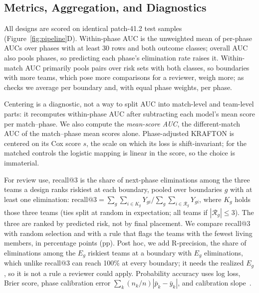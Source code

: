 \documentclass[sigconf,anonymous]{acmart}
\begin{document}
\subsection{Metrics, Aggregation, and Diagnostics}
\label{sec:method:units}
All designs are scored on identical patch-41.2 test samples (Figure~\ref{fig:pipeline}D). Within-phase AUC is the unweighted mean of per-phase AUCs over phases with at least 30 rows and both outcome classes; overall AUC also pools phases, so predicting each phase's elimination rate raises it. Within-match AUC primarily pools pairs over risk sets with both classes, so boundaries with more teams, which pose more comparisons for a reviewer, weigh more; as checks we average per boundary and, with equal phase weights, per phase.

Centering is a diagnostic, not a way to split AUC into match-level and team-level parts: it recomputes within-phase AUC after subtracting each model's mean score per match--phase. We also compute the \emph{mean-score AUC}, the different-match AUC of the match--phase mean scores alone. Phase-adjusted KRAFTON is centered on its Cox score $s$, the scale on which its loss is shift-invariant; for the matched controls the logistic mapping is linear in the score, so the choice is immaterial.

For review use, recall@3 is the share of next-phase eliminations among the three teams a design ranks riskiest at each boundary, pooled over boundaries $g$ with at least one elimination: $\mathrm{recall@3}=\sum_g\sum_{i\in K_g}Y_{gi}\big/\sum_g\sum_{i\in\mathcal{R}_g}Y_{gi}$, where $K_g$ holds those three teams (ties split at random in expectation; all teams if $|\mathcal{R}_g|\le3$). The three are ranked by predicted risk, not by final placement. We compare recall@3 with random selection and with a rule that flags the teams with the fewest living members, in percentage points (pp). Post hoc, we add R-precision, the share of eliminations among the $E_g$ riskiest teams at a boundary with $E_g$ eliminations, which unlike recall@3 can reach 100\% at every boundary; it needs the realized $E_g$, so it is not a rule a reviewer could apply. Probability accuracy uses log loss, Brier score, phase calibration error $\sum_k(n_k/n)|\bar p_k-\bar y_k|$, and calibration slope~\cite{VanCalster16}.
\end{document}
